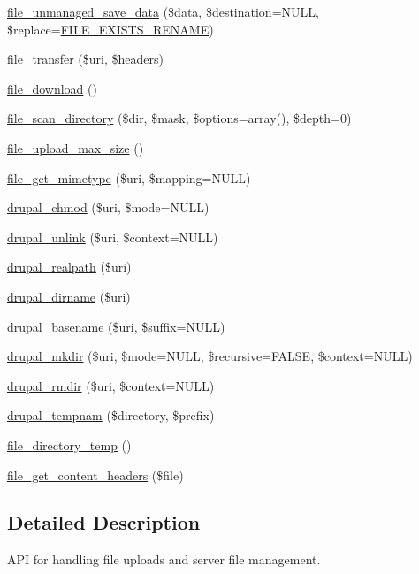 \begin{DoxyCompactItemize}
\hyperlink{group__file_gac2d047d4471ec93803f584cda01a557c}{file\_\-unmanaged\_\-save\_\-data} (\$data, \$destination=NULL, \$replace=\hyperlink{group__file_ga5d6636d4ccd022885823b91f17a0f464}{FILE\_\-EXISTS\_\-RENAME})
\item 
\hyperlink{group__file_ga7b047ab67ab5bb3882d573d7e06ab485}{file\_\-transfer} (\$uri, \$headers)
\item 
\hyperlink{group__file_ga91226299fab7e95a673f6461bbc19b02}{file\_\-download} ()
\item 
\hyperlink{group__file_ga363e988787ffa45bff69ff051eed0615}{file\_\-scan\_\-directory} (\$dir, \$mask, \$options=array(), \$depth=0)
\item 
\hyperlink{group__file_ga7cf25e6a2532a1d022ee1c655f895380}{file\_\-upload\_\-max\_\-size} ()
\item 
\hyperlink{group__file_ga2f3c500f59ecd606e4022ed9d83a1dec}{file\_\-get\_\-mimetype} (\$uri, \$mapping=NULL)
\item 
\hyperlink{group__php__wrappers_ga5fc93f1c4e81ea4f5b1b32775fca489c}{drupal\_\-chmod} (\$uri, \$mode=NULL)
\item 
\hyperlink{group__php__wrappers_ga533bc32da8860919d20d60ada655e494}{drupal\_\-unlink} (\$uri, \$context=NULL)
\item 
\hyperlink{group__php__wrappers_gafaa5b186c9e78f53b39aae12633eea44}{drupal\_\-realpath} (\$uri)
\item 
\hyperlink{group__php__wrappers_gad00418a5880c03f43e5eccfaa62863f6}{drupal\_\-dirname} (\$uri)
\item 
\hyperlink{group__php__wrappers_ga0125d5e205f50be86146a8df58c2bc5f}{drupal\_\-basename} (\$uri, \$suffix=NULL)
\item 
\hyperlink{group__php__wrappers_ga0cd03adb94eea525f87fb061c9a33340}{drupal\_\-mkdir} (\$uri, \$mode=NULL, \$recursive=FALSE, \$context=NULL)
\item 
\hyperlink{group__php__wrappers_ga394629431629976febfae765abd63e48}{drupal\_\-rmdir} (\$uri, \$context=NULL)
\item 
\hyperlink{group__php__wrappers_ga47b9f13fc4bed06501c52d1808de1661}{drupal\_\-tempnam} (\$directory, \$prefix)
\item 
\hyperlink{group__file_ga250e5cfba54030ab1e5f031608860e42}{file\_\-directory\_\-temp} ()
\item 
\hyperlink{group__file_ga33aed1fe449367d57b8f9a774a449f27}{file\_\-get\_\-content\_\-headers} (\$file)
\end{DoxyCompactItemize}


\subsection{Detailed Description}
API for handling file uploads and server file management. 